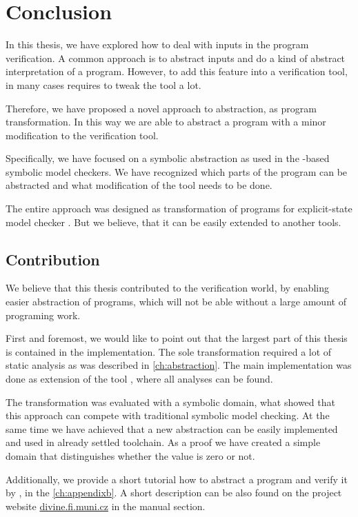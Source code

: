\chapter{Conclusion}\label{ch:conclusion}

In this thesis, we have explored how to deal with inputs in the program
verification. A common approach is to abstract inputs and do a kind of abstract
interpretation of a program. However, to add this feature into a verification
tool, in many cases requires to tweak the tool a lot.

Therefore, we have proposed a novel approach to abstraction, as program
transformation. In this way we are able to abstract a program with a minor
modification to the verification tool.

Specifically, we have focused on a symbolic abstraction as used in the \SMT-based
symbolic model checkers. We have recognized which parts of the program can be
abstracted and what modification of the tool needs to be done.

The entire approach was designed as transformation of \LLVM programs for
explicit-state model checker \DIVINE. But we believe, that it can be easily extended
to another tools.

\section{Contribution}
We believe that this thesis contributed to the verification world, by enabling
easier abstraction of programs, which will not be able without a large amount of
programing work.

First and foremost, we would like to point out that the largest part of this
thesis is contained in the implementation. The sole transformation required
a lot of static analysis as was described in \autoref{ch:abstraction}. The main
implementation was done as extension of the tool \LART, where all analyses can be
found.

The transformation was evaluated with a symbolic domain,
what showed that this approach can compete with traditional symbolic model
checking.  At the same time we have achieved that a new abstraction can be
easily implemented and used in already settled \DIVINE toolchain. As a proof
we have created a simple domain that distinguishes whether the value is zero
or not.

Additionally, we provide a short tutorial how to abstract a program and verify it by
\DIVINE, in the \autoref{ch:appendixb}. A short description can be also found on
the project website \url{divine.fi.muni.cz} in the manual section.

